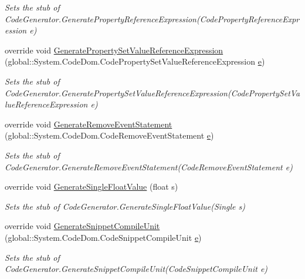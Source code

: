 \begin{DoxyCompactItemize}
\begin{DoxyCompactList}\small\item\em Sets the stub of Code\-Generator.\-Generate\-Property\-Reference\-Expression(\-Code\-Property\-Reference\-Expression e)\end{DoxyCompactList}\item 
override void \hyperlink{class_system_1_1_code_dom_1_1_compiler_1_1_fakes_1_1_stub_code_generator_a6fb0acb4d20e3688a74b1d37296d9776}{Generate\-Property\-Set\-Value\-Reference\-Expression} (global\-::\-System.\-Code\-Dom.\-Code\-Property\-Set\-Value\-Reference\-Expression \hyperlink{jquery-1_810_82_8min_8js_a2c038346d47955cbe2cb91e338edd7e1}{e})
\begin{DoxyCompactList}\small\item\em Sets the stub of Code\-Generator.\-Generate\-Property\-Set\-Value\-Reference\-Expression(\-Code\-Property\-Set\-Value\-Reference\-Expression e)\end{DoxyCompactList}\item 
override void \hyperlink{class_system_1_1_code_dom_1_1_compiler_1_1_fakes_1_1_stub_code_generator_a65dbdc538d7309d2bfaa009a525998ac}{Generate\-Remove\-Event\-Statement} (global\-::\-System.\-Code\-Dom.\-Code\-Remove\-Event\-Statement \hyperlink{jquery-1_810_82_8min_8js_a2c038346d47955cbe2cb91e338edd7e1}{e})
\begin{DoxyCompactList}\small\item\em Sets the stub of Code\-Generator.\-Generate\-Remove\-Event\-Statement(\-Code\-Remove\-Event\-Statement e)\end{DoxyCompactList}\item 
override void \hyperlink{class_system_1_1_code_dom_1_1_compiler_1_1_fakes_1_1_stub_code_generator_ac65f75f3ccb649c8fa38a8d66452a97a}{Generate\-Single\-Float\-Value} (float s)
\begin{DoxyCompactList}\small\item\em Sets the stub of Code\-Generator.\-Generate\-Single\-Float\-Value(\-Single s)\end{DoxyCompactList}\item 
override void \hyperlink{class_system_1_1_code_dom_1_1_compiler_1_1_fakes_1_1_stub_code_generator_a7d2e4b3c9f57767bb20d4667ce7b5374}{Generate\-Snippet\-Compile\-Unit} (global\-::\-System.\-Code\-Dom.\-Code\-Snippet\-Compile\-Unit \hyperlink{jquery-1_810_82_8min_8js_a2c038346d47955cbe2cb91e338edd7e1}{e})
\begin{DoxyCompactList}\small\item\em Sets the stub of Code\-Generator.\-Generate\-Snippet\-Compile\-Unit(\-Code\-Snippet\-Compile\-Unit e)\end{DoxyCompactList}\item 

\end{DoxyCompactItemize}
